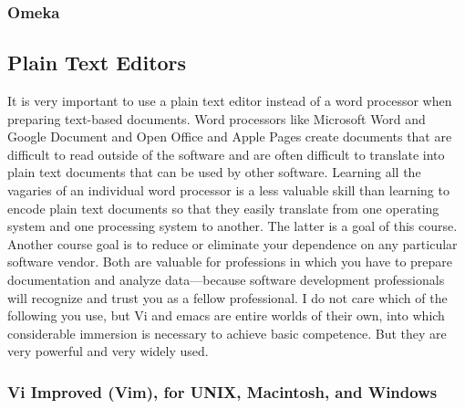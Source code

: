 \documentclass[]{article}
\begin{document}
\subsubsection{Omeka}\label{omeka}

\subsection{Plain Text Editors}\label{plain-text-editors}

It is very important to use a plain text editor instead of a word
processor when preparing text-based documents. Word processors like
Microsoft Word and Google Document and Open Office and Apple Pages
create documents that are difficult to read outside of the software and
are often difficult to translate into plain text documents that can be
used by other software. Learning all the vagaries of an individual word
processor is a less valuable skill than learning to encode plain text
documents so that they easily translate from one operating system and
one processing system to another. The latter is a goal of this course.
Another course goal is to reduce or eliminate your dependence on any
particular software vendor. Both are valuable for professions in which
you have to prepare documentation and analyze data---because software
development professionals will recognize and trust you as a fellow
professional. I do not care which of the following you use, but Vi and
emacs are entire worlds of their own, into which considerable immersion
is necessary to achieve basic competence. But they are very powerful and
very widely used.

\subsubsection{Vi Improved (Vim), for UNIX, Macintosh, and
Windows}\label{vi-improved-vim-for-unix-macintosh-and-windows}
\end{document}
